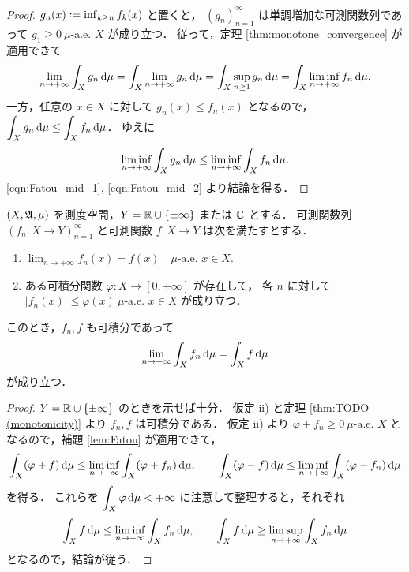 \begin{proof}
    $g_n(x)\defeq\inf_{k\ge n}f_k(x)$ と置くと，
    $(g_n)_{n=1}^\infty$ は単調増加な可測関数列であって $g_1\ge0\ \text{$\mu$-a.e.\ $X$}$ が成り立つ．
    従って，定理 \ref{thm:monotone_convergence} が適用できて
    \begin{align}
        \lim_{n\to+\infty}\int_Xg_n\,\mathrm{d}\mu
        =\int_X\lim_{n\to+\infty}g_n\,\mathrm{d}\mu
        =\int_X\sup_{n\ge1}g_n\,\mathrm{d}\mu
        =\int_X\liminf_{n\to+\infty}f_n\,\mathrm{d}\mu.\label{eqn:Fatou_mid_1}
    \end{align}
    一方，任意の $x\in X$ に対して $g_n(x)\le f_n(x)$ となるので，$\displaystyle\int_Xg_n\,\mathrm{d}\mu\le\int_Xf_n\,\mathrm{d}\mu$．
    ゆえに
    \begin{align}
        \liminf_{n\to+\infty}\int_Xg_n\,\mathrm{d}\mu\le\liminf_{n\to+\infty}\int_Xf_n\,\mathrm{d}\mu.
        \label{eqn:Fatou_mid_2}
    \end{align}
    \eqref{eqn:Fatou_mid_1}, \eqref{eqn:Fatou_mid_2} より結論を得る．
\end{proof}

\begin{theorem}\label{thm:dominated_convergence}
    $(X,\mathfrak{A},\mu)$ を測度空間，$Y=\mathbb{R}\cup\{\pm\infty\}$ または $\mathbb{C}$ とする．
    可測関数列 $(f_n:X\to Y)_{n=1}^\infty$ と可測関数 $f:X\to Y$ は次を満たすとする．
    \begin{enumerate}
        \item $\displaystyle\lim_{n\to+\infty}f_n(x)=f(x)\quad\text{$\mu$-a.e.\ $x\in X$}$.
        \item ある可積分関数 $\varphi:X\to[0,+\infty]$ が存在して，
            各 $n$ に対して $|f_n(x)|\le\varphi(x)\ \text{$\mu$-a.e.\ $x\in X$}$ が成り立つ．
    \end{enumerate}
    このとき，$f_n,f$ も可積分であって
    \begin{align*}
        \lim_{n\to+\infty}\int_Xf_n\,\mathrm{d}\mu=\int_Xf\,\mathrm{d}\mu
    \end{align*}
    が成り立つ．
\end{theorem}

\begin{proof}
    $Y=\mathbb{R}\cup\{\pm\infty\}$ のときを示せば十分．
    仮定 \textrm{ii)} と定理 \ref{thm:TODO (monotonicity)} より $f_n,f$ は可積分である．
    仮定 \textrm{ii)} より $\varphi\pm f_n\ge0\ \text{$\mu$-a.e.\ $X$}$ となるので，補題 \ref{lem:Fatou} が適用できて，
    \begin{align*}
        \int_X(\varphi+f)\,\mathrm{d}\mu\le\liminf_{n\to+\infty}\int_X(\varphi+f_n)\,\mathrm{d}\mu,\qquad
        \int_X(\varphi-f)\,\mathrm{d}\mu\le\liminf_{n\to+\infty}\int_X(\varphi-f_n)\,\mathrm{d}\mu
    \end{align*}
    を得る．
    これらを $\displaystyle\int_X\varphi\,\mathrm{d}\mu<+\infty$ に注意して整理すると，それぞれ
    \begin{align*}
        \int_Xf\,\mathrm{d}\mu\le\liminf_{n\to+\infty}\int_Xf_n\,\mathrm{d}\mu,\qquad
        \int_Xf\,\mathrm{d}\mu\ge\limsup_{n\to+\infty}\int_Xf_n\,\mathrm{d}\mu
    \end{align*}
    となるので，結論が従う．
\end{proof}
